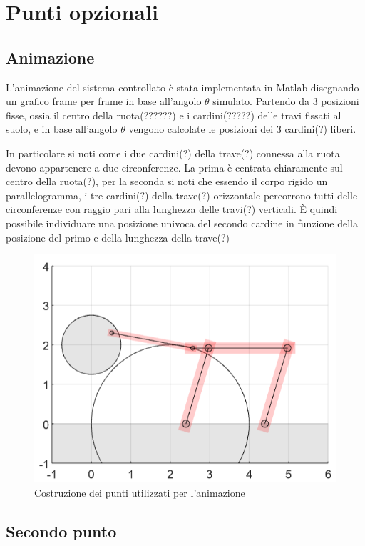 \documentclass[a4paper, 11pt]{article}
\begin{document}
\section{Punti opzionali}

\subsection{Animazione}

L'animazione del sistema controllato è stata implementata in Matlab disegnando un grafico frame per frame in base all'angolo $\theta$ simulato.
Partendo da 3 posizioni fisse, ossia il centro della ruota(??????) e i cardini(?????) delle travi fissati al suolo, e in base all'angolo $\theta$ vengono calcolate le posizioni dei 3 cardini(?) liberi.

In particolare si noti come i due cardini(?) della trave(?) connessa alla ruota devono appartenere a due circonferenze. La prima è centrata chiaramente sul centro della ruota(?), per la seconda si noti che essendo il corpo rigido un parallelogramma, i tre cardini(?) della trave(?) orizzontale percorrono tutti delle circonferenze con raggio pari alla lunghezza delle travi(?) verticali. È quindi possibile individuare una posizione univoca del secondo cardine in funzione della posizione del primo e della lunghezza della trave(?)

\begin{figure}[h!]
	\centering
	\includegraphics[width=0.4\linewidth]{./images/animazione_costruzione.png}
	\caption{Costruzione dei punti utilizzati per l'animazione}
	\label{fig:animazione_costruzione}
\end{figure}

\subsection{Secondo punto}
\end{document}

